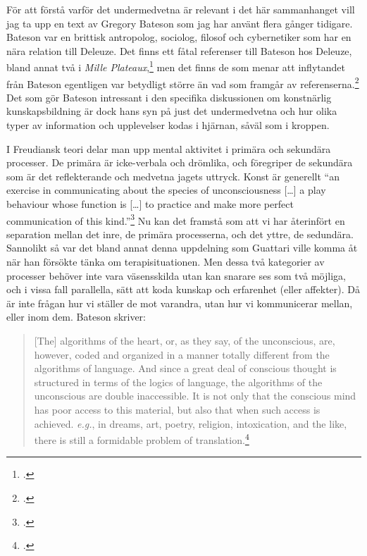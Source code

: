 \documentclass[11pt]{article}
\begin{document}
För att förstå varför det undermedvetna är relevant i det här
sammanhanget vill jag ta upp en text av Gregory Bateson som jag har
använt flera gånger tidigare. Bateson var en brittisk antropolog,
sociolog, filosof och cybernetiker som har en nära relation till
Deleuze. Det finns ett fåtal referenser till Bateson hos Deleuze,
bland annat två i \emph{Mille Plateaux},\footcite{deleuze80} men det
finns de som menar att inflytandet från Bateson egentligen var
betydligt större än vad som framgår av referenserna.\footcite[Se
t.ex. ][ Begrepp som \emph{rhizome}, \emph{double bind}, och
\emph{schizoanalysis} som alla var viktiga för Deleuze och Guattari
diskuterades långt tidigare av Bateson, även om just \emph{double
    bind} introducerades av Nietsche.]{Shaw2015} Det som gör Bateson
intressant i den specifika diskussionen om konstnärlig
kunskapsbildning är dock hans syn på just det undermedvetna och hur
olika typer av information och upplevelser kodas i hjärnan, såväl som
i kroppen.

I Freudiansk teori delar man upp mental aktivitet i primära och
sekundära processer. De primära är icke-verbala och drömlika, och
föregriper de sekundära som är det reflekterande och medvetna jagets
uttryck. Konst är generellt ``an exercise in communicating about the
species of unconsciousness [\ldots] a play behaviour whose function is
[\ldots] to practice and make more perfect communication of this
kind.''\footcite[sid. 137]{bateson72} Nu kan det framstå som att vi har
återinfört en separation mellan det inre, de primära processerna, och
det yttre, de sedundära. Sannolikt så var det bland annat denna
uppdelning som Guattari ville komma åt när han försökte tänka om
terapisituationen. Men dessa två kategorier av processer behöver inte
vara väsensskilda utan kan snarare ses som två möjliga, och i vissa
fall parallella, sätt att koda kunskap och erfarenhet (eller
affekter). Då är inte frågan hur vi ställer de mot varandra, utan hur
vi kommunicerar mellan, eller inom dem. Bateson skriver:

\begin{quote} [The] algorithms of the heart, or, as they say, of the
    unconscious, are, however, coded and organized in a manner totally
    different from the algorithms of language. And since a great deal
    of conscious thought is structured in terms of the logics of
    language, the algorithms of the unconscious are double
    inaccessible. It is not only that the conscious mind has poor
    access to this material, but also that when such access is
    achieved. \emph{e.g.}, in dreams, art, poetry, religion,
    intoxication, and the like, there is still a formidable problem of
    translation.\footcite[sid. 139]{bateson72}
\end{quote}
\end{document}
